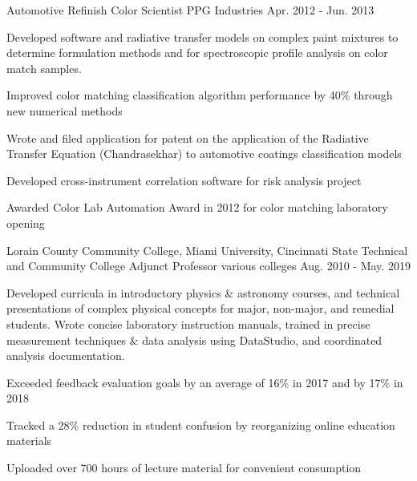 \begin{cventries}
  \cventry
    {Automotive Refinish} %
    {Color Scientist} %
    {PPG Industries} %
    {Apr. 2012 - Jun. 2013} %
    {
      \begin{cvparagraph}
        Developed software and radiative transfer models on complex paint mixtures to determine formulation methods and for spectroscopic profile analysis on color match samples.
      \end{cvparagraph}
      \begin{cvitems} %
        \item {Improved color matching classification algorithm performance by 40\% through new numerical methods}
        \item {Wrote and filed application for patent on the application of the Radiative Transfer Equation (Chandrasekhar) to automotive coatings classification models}
        \item {Developed cross-instrument correlation software for risk analysis project}
        \item {Awarded Color Lab Automation Award in 2012 for color matching laboratory opening}
      \end{cvitems}
    }

  \cventry
    {Lorain County Community College, Miami University, Cincinnati State Technical and Community College} %
    {Adjunct Professor} %
    {various colleges} %
    {Aug. 2010 - May. 2019} %
    {
      \begin{cvparagraph}
        Developed curricula in introductory physics \& astronomy courses, and technical presentations of complex physical concepts for major, non-major, and remedial students.  Wrote concise laboratory instruction manuals, trained in precise measurement techniques \& data analysis using DataStudio, and coordinated analysis documentation.
      \end{cvparagraph}
      \begin{cvitems} %
        \item {Exceeded feedback evaluation goals by an average of 16\% in 2017 and by 17\% in 2018}
        \item {Tracked a 28\% reduction in student confusion by reorganizing online education materials}
        \item {Uploaded over 700 hours of lecture material for convenient consumption}
      \end{cvitems}
    }


\end{cventries}
